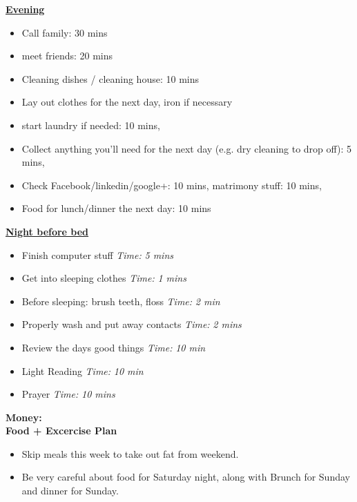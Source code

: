 \documentclass[11pt]{article}
\newcommand{\timeEst}[1]{\textit{Time:} \textit{#1}}
\begin{document}
{\underline{\textbf{Evening}}
\begin{itemize}
\tiny \item \tiny Call family: 30 mins
\item \tiny meet friends: 20 mins
\item \tiny Cleaning dishes / cleaning house: 10 mins
\item \tiny Lay out clothes for the next day, iron if necessary
\item \tiny start laundry if needed: 10 mins,
\item \tiny Collect anything you’ll need for the next day (e.g. dry cleaning to drop off): 5 mins,
\item \tiny Check Facebook/linkedin/google+: 10 mins, matrimony stuff: 10 mins,
\item \tiny Food for lunch/dinner the next day: 10 mins
\end{itemize}

\underline{\textbf{Night before bed}}
\begin{itemize}
\tiny \item \tiny Finish computer stuff \timeEst{5 mins}
\item \tiny Get into sleeping clothes \timeEst{1 mins}
\item \tiny Before sleeping: brush teeth, floss \timeEst{ 2 min}
\item \tiny Properly wash and put away contacts \timeEst{ 2 mins}
\item \tiny Review the days good things \timeEst{ 10 min}
\item \tiny Light Reading \timeEst{ 10 min}
\item \tiny Prayer \timeEst{10 mins}
\end{itemize}

\newpage

\textbf{Money:}  \\ 

\textbf{Food + Excercise Plan}\\
  \begin{itemize}
      \tiny \item \tiny Skip meals this week to take out fat from weekend.
    \item \tiny Be very careful about food for Saturday night, along with Brunch for Sunday and dinner for Sunday.
  \end{itemize} 

}
\end{document}
